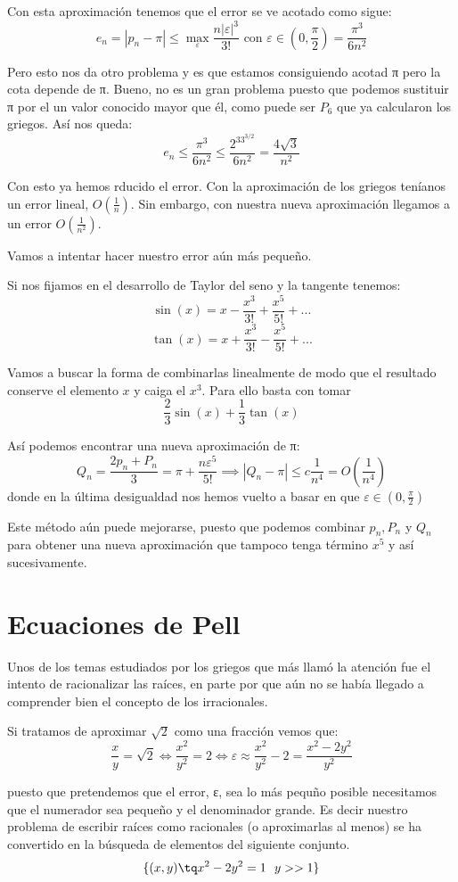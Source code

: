 \documentclass{apuntes}
\begin{document}
Con esta aproximación tenemos que el error se ve acotado como sigue:
\[e_n = |p_n-π| \leq \max_ε \frac{n|ε|^3}{3!} \text{ con } ε \in \left( 0, \frac{π}{2} \right) = \frac{π^3}{6n^2}\]

Pero esto nos da otro problema y es que estamos consiguiendo acotad π pero la cota depende de π. Bueno, no es un gran problema puesto que podemos sustituir π por el un valor conocido mayor que él, como puede ser $P_6$ que ya calcularon los griegos. Así nos queda:
\[e_n \leq \frac{π^3}{6n^2} \leq \frac{2^33^{3/2}}{6n^2}=\frac{4\sqrt{3}}{n^2}\]

Con esto ya hemos rducido el error. Con la aproximación de los griegos teníanos un error lineal, $O\left( \frac{1}{n}\right)$. Sin embargo, con nuestra nueva aproximación llegamos a un error $O\left( \frac{1}{n^2}\right)$.

Vamos a intentar hacer nuestro error aún más pequeño.

Si nos fijamos en el desarrollo de Taylor del seno y la tangente tenemos:
\[\sin(x)=x-\frac{x^3}{3!}+\frac{x^5}{5!}+...\]
\[\tan(x)=x+\frac{x^3}{3!}-\frac{x^5}{5!}+...\]

Vamos a buscar la forma de combinarlas linealmente de modo que el resultado conserve el elemento $x$ y caiga el $x^3$. Para ello basta con tomar 
\[\frac{2}{3}\sin(x)+\frac{1}{3}\tan(x)\]

Así podemos encontrar una nueva aproximación de π:
\[Q_n = \frac{2p_n+P_n}{3} = π + \frac{nε^5}{5!} \implies |Q_n-π| \leq c\frac{1}{n^4}=O\left( \frac{1}{n^4}\right)\]
donde en la última desigualdad nos hemos vuelto a basar en que $ε\in\left( 0, \frac{π}{2} \right)$

Este método aún puede mejorarse, puesto que podemos combinar $p_n,P_n$ y $Q_n$ para obtener una nueva aproximación que tampoco tenga término $x^5$ y así sucesivamente.

\chapter{Ecuaciones de Pell}
Unos de los temas estudiados por los griegos que más llamó la atención fue el intento de racionalizar las raíces, en parte por que aún no se había llegado a comprender bien el concepto de los irracionales.

Si tratamos de aproximar $\sqrt{2}$ como una fracción vemos que:
\[\frac{x}{y} = \sqrt{2} \iff \frac{x^2}{y^2} = 2 \iff ε \approx \frac{x^2}{y^2} - 2 = \frac{x^2-2y^2}{y^2}\]

puesto que pretendemos que el error, ε, sea lo más pequño posible necesitamos que el numerador sea pequeño y el denominador grande. Es decir nuestro problema de escribir raíces como racionales (o aproximarlas al menos) se ha convertido en la búsqueda de elementos del siguiente conjunto.
\[\{(x,y) \tq x^2-2y^2 = 1 \ \ y >> 1\}\]
\end{document}
